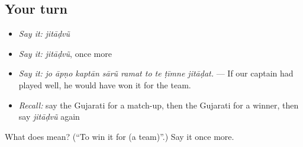 \subsection*{Your turn}
\begin{itemize}
\raggedright
  \item \emph{Say it:} \emph{jitāḍvũ}
  \item \emph{Say it:} \emph{jitāḍvũ}, once more
  \item \emph{Say it:} \emph{jo āpṇo kaptān sārũ ramat to te ṭīmne jitāḍat.} — If our captain had played well, he would have won it for the team.
  \item \emph{Recall:} say the Gujarati for a match-up, then the Gujarati for a winner, then say \emph{jitāḍvũ} again
\end{itemize}

\begin{tcolorbox}[breakable,colback=teal!4,colframe=teal!35!black,title={Before you move on}]
What does  mean? (\textquotedblleft{}To win it for (a team)\textquotedblright{}.) Say it once more.
\end{tcolorbox}
